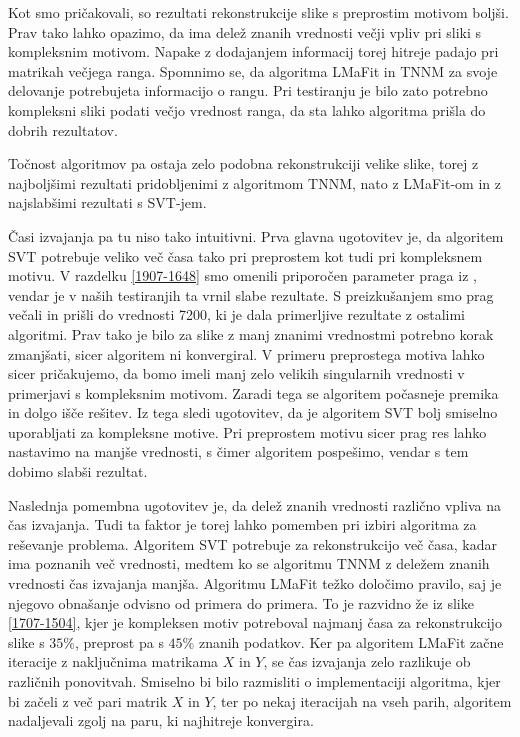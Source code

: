 Kot smo pričakovali, so rezultati rekonstrukcije slike s preprostim motivom boljši. Prav tako lahko opazimo, da ima delež znanih vrednosti večji vpliv pri sliki s kompleksnim motivom. Napake z dodajanjem informacij torej hitreje padajo pri matrikah večjega ranga. Spomnimo se, da algoritma LMaFit in TNNM za svoje delovanje potrebujeta informacijo o rangu. Pri testiranju je bilo zato potrebno kompleksni sliki podati večjo vrednost ranga, da sta lahko algoritma prišla do dobrih rezultatov.

Točnost algoritmov pa ostaja zelo podobna rekonstrukciji velike slike, torej z najboljšimi rezultati pridobljenimi z algoritmom TNNM, nato z LMaFit-om in z najslabšimi rezultati s SVT-jem.





Časi izvajanja pa tu niso tako intuitivni. Prva glavna ugotovitev je, da algoritem SVT potrebuje veliko več časa tako pri preprostem kot tudi pri kompleksnem motivu. V razdelku \ref{1907-1648} smo omenili priporočen parameter praga iz \cite{CCS}, vendar je v naših testiranjih ta  vrnil slabe rezultate. S preizkušanjem smo prag večali in prišli do vrednosti 7200, ki je dala primerljive rezultate z ostalimi algoritmi. Prav tako je bilo za slike z manj znanimi vrednostmi potrebno korak zmanjšati, sicer algoritem ni konvergiral. V primeru preprostega motiva lahko sicer pričakujemo, da bomo imeli manj zelo velikih singularnih vrednosti v primerjavi s kompleksnim motivom.  Zaradi tega se algoritem počasneje premika in dolgo išče rešitev. Iz tega sledi ugotovitev, da je algoritem SVT bolj smiselno uporabljati za kompleksne motive. Pri preprostem motivu sicer prag res lahko nastavimo na manjše vrednosti, s čimer algoritem pospešimo, vendar s tem dobimo slabši rezultat.

Naslednja pomembna ugotovitev je, da delež znanih vrednosti različno vpliva na čas izvajanja. Tudi ta faktor je torej lahko pomemben pri izbiri algoritma za reševanje problema. Algoritem SVT potrebuje za rekonstrukcijo več časa, kadar ima poznanih več vrednosti, medtem ko se algoritmu TNNM z deležem znanih vrednosti čas izvajanja manjša. Algoritmu LMaFit težko določimo pravilo, saj je njegovo obnašanje odvisno od primera do primera. To je razvidno že iz slike \ref{1707-1504}, kjer je kompleksen motiv potreboval najmanj časa za rekonstrukcijo slike s $35\%$, preprost pa s $45\%$ znanih podatkov. Ker pa algoritem LMaFit začne iteracije z naključnima matrikama $X$ in $Y$, se čas izvajanja zelo razlikuje ob različnih ponovitvah. Smiselno bi bilo razmisliti o implementaciji algoritma, kjer bi začeli z več pari matrik $X$ in $Y$, ter po nekaj iteracijah na vseh parih, algoritem nadaljevali zgolj na paru, ki najhitreje konvergira.
